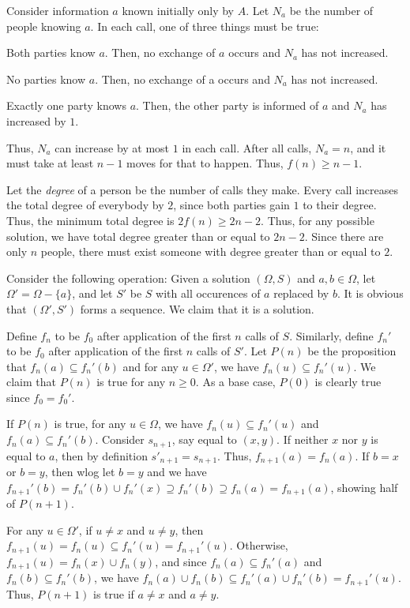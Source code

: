 \documentclass[12pt]{article}
\begin{document}
Consider information $a$ known initially only by $A$.
Let $N_a$ be the number of people knowing $a$.
In each call, one of three things must be true:
\begin{compactitem}
\item Both parties know $a$. 
    Then, no exchange of $a$ occurs and $N_a$ has not increased.
\item No parties know $a$. 
    Then, no exchange of a occurs and $N_a$ has not increased.
\item Exactly one party knows $a$.
    Then, the other party is informed of $a$ and $N_a$ has increased by $1$.
\end{compactitem}
Thus, $N_a$ can increase by at most $1$ in each call. 
After all calls, $N_a = n$, and it must take at least $n-1$ moves
for that to happen. Thus, $f(n) \ge n - 1$.

Let the \emph{degree} of a person be the number of calls they make.
Every call increases the total degree of everybody by $2$,
since both parties gain $1$ to their degree.
Thus, the minimum total degree is $2f(n) \ge 2n - 2$.
Thus, for any possible solution,
we have total degree greater than or equal to $2n - 2$.
Since there are only $n$ people, there must exist
someone with degree greater than or equal to $2$.

Consider the following operation: 
Given a solution $(\Omega, S)$ and $a,b \in \Omega$,
let $\Omega' = \Omega - \{a\}$, and
let $S'$ be $S$ with all occurences of $a$ replaced by $b$.
It is obvious that $(\Omega', S')$ forms a sequence.
We claim that it is a solution.

Define $f_n$ to be $f_{0}$ after application
of the first $n$ calls of $S$.
Similarly, define $f_n'$ to be $f_{0}$ after application
of the first $n$ calls of $S'$.
Let $P(n)$ be the proposition that 
$f_n(a) \subseteq f_n'(b)$ and
for any $u \in \Omega'$,
we have $f_n(u) \subseteq f_n'(u)$.
We claim that $P(n)$ is true for any $n \ge 0$.
As a base case, $P(0)$ is clearly true since $f_{0}=f_{0}'$.

If $P(n)$ is true, for any $u \in \Omega$, we have $f_n(u) \subseteq f_n'(u)$ and $f_n(a) \subseteq f_n'(b)$.
Consider $s _{n+1}$, say equal to $(x,y)$.
If neither $x$ nor $y$ is equal to $a$,
then by definition $s'_{n+1} = s_{n+1}$.
Thus, $f_{n+1}(a) = f_n(a)$.
If $b=x$ or $b=y$, then wlog let $b=y$ and we have
$f_{n+1}'(b) = f_{n}'(b) \cup f_n'(x) \supseteq f_n'(b) \supseteq f_n(a) = f_{n+1}(a)$, 
showing half of $P(n+1)$.

For any $u \in \Omega'$, if $u \ne x$ and $u \ne y$,
then $f_{n+1}(u) = f_n(u) \subseteq f_n'(u) = f_{n+1}'(u)$.
Otherwise, $f_{n+1}(u) = f_n(x) \cup f_n(y)$,
and since $f_n(a) \subseteq f_n'(a)$ and $f_n(b) \subseteq f_n'(b)$,
we have $f_n(a) \cup f_n(b) \subseteq f_n'(a) \cup f_n'(b) = f_{n+1}'(u)$.
Thus, $P(n+1)$ is true if $a \ne x$ and $a \ne y$.
\end{document}
